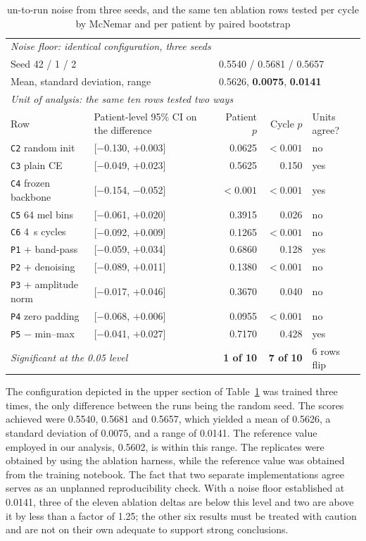 \documentclass[journal,onecolumn]{IEEEtran}
\newcommand{\best}[1]{\textbf{#1}}
\begin{document}
\begin{table}[hbtp]
\centering
\caption{un-to-run noise from three seeds, and the same ten ablation rows tested per cycle by McNemar and per patient
by paired bootstrap}
\label{tab:stats}
\footnotesize
\begin{tabular}{llrrl}
\toprule
\multicolumn{5}{l}{\emph{Noise floor: identical configuration, three seeds}}\\
\multicolumn{2}{l}{Seed 42 / 1 / 2} & \multicolumn{3}{l}{0.5540 / 0.5681 / 0.5657} \\
\multicolumn{2}{l}{Mean, standard deviation, range} & \multicolumn{3}{l}{0.5626, \best{0.0075}, \best{0.0141}} \\
\midrule
\multicolumn{5}{l}{\emph{Unit of analysis: the same ten rows tested two ways}}\\
Row & Patient-level 95\% CI on the difference & Patient $p$ & Cycle $p$ & Units agree? \\
\midrule
\texttt{C2} random init      & [$-$0.130, $+$0.003] & 0.0625 & $<0.001$ & no \\
\texttt{C3} plain CE         & [$-$0.049, $+$0.023] & 0.5625 & 0.150 & yes \\
\texttt{C4} frozen backbone  & [$-$0.154, $-$0.052] & \best{$<0.001$} & $<0.001$ & yes \\
\texttt{C5} 64 mel bins      & [$-$0.061, $+$0.020] & 0.3915 & 0.026 & no \\
\texttt{C6} 4~s cycles       & [$-$0.092, $+$0.009] & 0.1265 & $<0.001$ & no \\
\texttt{P1} + band-pass      & [$-$0.059, $+$0.034] & 0.6860 & 0.128 & yes \\
\texttt{P2} + denoising      & [$-$0.089, $+$0.011] & 0.1380 & $<0.001$ & no \\
\texttt{P3} + amplitude norm & [$-$0.017, $+$0.046] & 0.3670 & 0.040 & no \\
\texttt{P4} zero padding     & [$-$0.068, $+$0.006] & 0.0955 & $<0.001$ & no \\
\texttt{P5} $-$ min--max     & [$-$0.041, $+$0.027] & 0.7170 & 0.428 & yes \\
\midrule
\multicolumn{2}{l}{\emph{Significant at the 0.05 level}} & \best{1 of 10} & \best{7 of 10} & 6 rows flip \\
\bottomrule
\end{tabular}
\end{table}
The configuration depicted in the upper section of Table~\ref{tab:stats} was trained three times, the only difference between the runs being the random seed. The scores achieved were 0.5540, 0.5681 and 0.5657, which yielded a mean of 0.5626, a standard deviation of 0.0075, and a range of 0.0141. The reference value employed in our analysis, 0.5602, is within this range. The replicates were obtained by using the ablation harness, while the reference value was obtained from the training notebook. The fact that two separate implementations agree serves as an unplanned reproducibility check. With a noise floor established at 0.0141, three of the eleven ablation deltas are below this level and two are above it by less than a factor of 1.25; the other six results must be treated with caution and are not on their own adequate to support strong conclusions.
\end{document}
